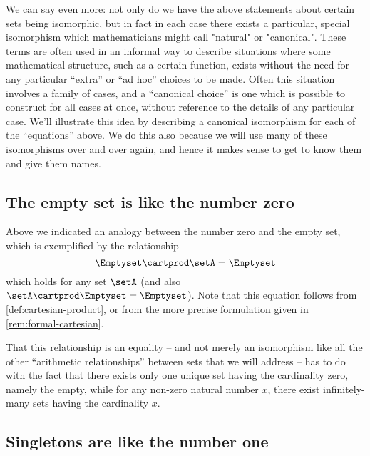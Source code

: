 
We can say even more: not only do we have the above statements about certain sets being isomorphic, but in fact in each case there exists a particular, special isomorphism which mathematicians might call "natural" or "canonical". These terms are often used in an informal way to describe situations where some mathematical structure, such as a certain function, exists without the need for any particular ``extra'' or ``ad hoc'' choices to be made. Often this situation involves a family of cases, and a ``canonical choice'' is one which is possible to construct for all cases at once, without reference to the details of any particular case. We'll illustrate this idea by describing a canonical isomorphism for each of the ``equations'' above. We do this also because we will use many of these isomorphisms over and over again, and hence it makes sense to get to know them and give them names. 


\subsection{The empty set is like the number zero}

Above we indicated an analogy between the number zero and the empty set, which is exemplified by the relationship
\begin{equation}
 \Emptyset \cartprod \setA  = \Emptyset
\end{equation}
which holds for any set $\setA$ (and also $\setA \cartprod \Emptyset  = \Emptyset$). Note that this equation follows from \cref{def:cartesian-product}, or from the more precise formulation given in \cref{rem:formal-cartesian}.

That this relationship is an equality -- and not merely an isomorphism like all the other ``arithmetic relationships'' between sets that we will address -- has to do with the fact that there exists only one unique set having the cardinality zero, namely the empty, while for any non-zero natural number $x$, there exist infinitely-many sets having the cardinality $x$. 

\subsection{Singletons are like the number one}


